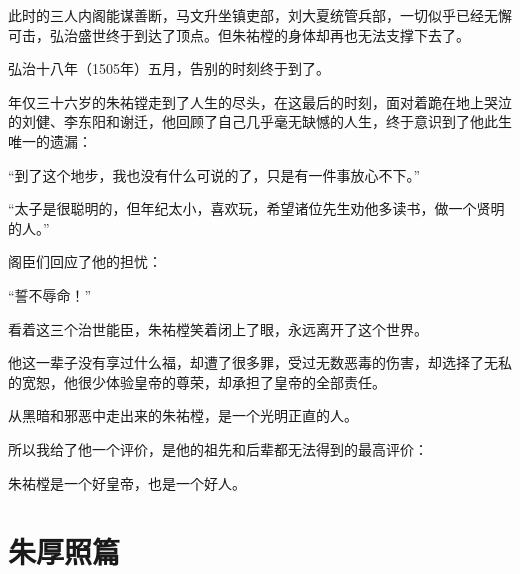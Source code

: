 \begin{multicols}{\theparacolNo}
		此时的三人内阁能谋善断，马文升坐镇吏部，刘大夏统管兵部，一切似乎已经无懈可击，弘治盛世终于到达了顶点。但朱祐樘的身体却再也无法支撑下去了。

		弘治十八年（1505年）五月，告别的时刻终于到了。

		年仅三十六岁的朱祐镗走到了人生的尽头，在这最后的时刻，面对着跪在地上哭泣的刘健、李东阳和谢迁，他回顾了自己几乎毫无缺憾的人生，终于意识到了他此生唯一的遗漏：

		“到了这个地步，我也没有什么可说的了，只是有一件事放心不下。”

		“太子是很聪明的，但年纪太小，喜欢玩，希望诸位先生劝他多读书，做一个贤明的人。”

		阁臣们回应了他的担忧：

		“誓不辱命！”

		看着这三个治世能臣，朱祐樘笑着闭上了眼，永远离开了这个世界。

		他这一辈子没有享过什么福，却遭了很多罪，受过无数恶毒的伤害，却选择了无私的宽恕，他很少体验皇帝的尊荣，却承担了皇帝的全部责任。

		从黑暗和邪恶中走出来的朱祐樘，是一个光明正直的人。

		所以我给了他一个评价，是他的祖先和后辈都无法得到的最高评价：

		朱祐樘是一个好皇帝，也是一个好人。
		\ifnum{}
	\end{multicols}
\fi
\newpage
\chapter*{朱厚照篇}
